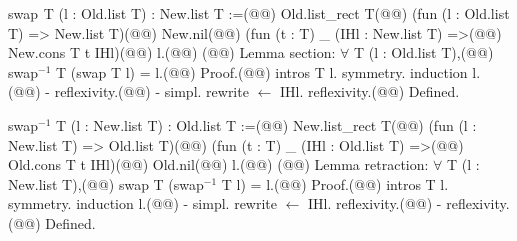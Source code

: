 swap$\phantom{^{2}}$T (l : Old.list T) : New.list T :=(@\vspace{-0.04cm}@)
  Old.list_rect T(@\vspace{-0.04cm}@)
    (fun (l : Old.list T) => New.list T)(@\vspace{-0.04cm}@)
    New.nil(@\vspace{-0.04cm}@)
    (fun (t : T) _ (IHl : New.list T) =>(@\vspace{-0.04cm}@)
      New.cons T t IHl)(@\vspace{-0.04cm}@)
    l.(@\vspace{-0.04cm}@)
(@\vspace{-0.04cm}@)
Lemma section: $\forall$ T (l : Old.list T),(@\vspace{-0.04cm}@)
  swap$^{-1}$ T (swap T l) = l.(@\vspace{-0.04cm}@)
Proof.(@\vspace{-0.04cm}@)
  intros T l. symmetry. induction l.(@\vspace{-0.04cm}@)
  - reflexivity.(@\vspace{-0.04cm}@)
  - simpl. rewrite $\leftarrow$ IHl. reflexivity.(@\vspace{-0.04cm}@)
Defined.

swap$^{-1}$ T (l : New.list T) : Old.list T :=(@\vspace{-0.04cm}@)
  New.list_rect T(@\vspace{-0.04cm}@)
    (fun (l : New.list T) => Old.list T)(@\vspace{-0.04cm}@)
    (fun (t : T) _ (IHl : Old.list T) =>(@\vspace{-0.04cm}@)
      Old.cons T t IHl)(@\vspace{-0.04cm}@)
    Old.nil(@\vspace{-0.04cm}@)
    l.(@\vspace{-0.04cm}@)
(@\vspace{-0.04cm}@)
Lemma retraction: $\forall$ T (l : New.list T),(@\vspace{-0.04cm}@)
  swap T (swap$^{-1}$ T l) = l.(@\vspace{-0.04cm}@)
Proof.(@\vspace{-0.04cm}@)
  intros T l. symmetry. induction l.(@\vspace{-0.04cm}@)
  - simpl. rewrite $\leftarrow$ IHl. reflexivity.(@\vspace{-0.04cm}@)
  - reflexivity.(@\vspace{-0.04cm}@)
Defined.
